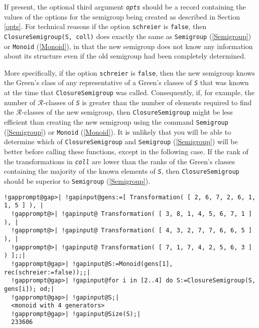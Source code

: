\documentclass[a4paper,11pt]{report}
\begin{document}
{{{ If present, the optional third argument \mbox{\texttt{\mdseries\slshape opts}} should be a record containing the values of the options for the semigroup
being created as described in Section \ref{opts}. For technical reasons if the option \texttt{schreier} is \texttt{false}, then \texttt{ClosureSemigroup(S, coll)} does exactly the same as \texttt{Semigroup} (\ref{Semigroup}) or \texttt{Monoid} (\ref{Monoid}), in that the new semigroup does not know any information about its structure
even if the old semigroup had been completely determined. 

 More specifically, if the option \texttt{schreier} is \texttt{false}, then the new semigroup knows the Green's class of any representative of a
Green's classes of \mbox{\texttt{\mdseries\slshape S}} that was known at the time that \texttt{ClosureSemigroup} was called. Consequently, if, for example, the number of $\mathcal{R}$-classes of \mbox{\texttt{\mdseries\slshape S}} is greater than the number of elements required to find the $\mathcal{R}$-classes of the new semigroup, then \texttt{ClosureSemigroup} might be less efficient than creating the new semigroup using the command \texttt{Semigroup} (\ref{Semigroup}) or \texttt{Monoid} (\ref{Monoid}). It is unlikely that you will be able to determine which of \texttt{ClosureSemigroup} and \texttt{Semigroup} (\ref{Semigroup}) will be better before calling these functions, except in the following case.
If the rank of the transformations in \mbox{\texttt{\mdseries\slshape coll}} are lower than the ranks of the Green's classes containing the majority of the
known elements of \mbox{\texttt{\mdseries\slshape S}}, then \texttt{ClosureSemigroup} should be superior to \texttt{Semigroup} (\ref{Semigroup}). 
\begin{Verbatim}[commandchars=!@|,fontsize=\small,frame=single,label=Example]
  !gapprompt@gap>| !gapinput@gens:=[ Transformation( [ 2, 6, 7, 2, 6, 1, 1, 5 ] ), |
  !gapprompt@>| !gapinput@ Transformation( [ 3, 8, 1, 4, 5, 6, 7, 1 ] ), |
  !gapprompt@>| !gapinput@ Transformation( [ 4, 3, 2, 7, 7, 6, 6, 5 ] ), |
  !gapprompt@>| !gapinput@ Transformation( [ 7, 1, 7, 4, 2, 5, 6, 3 ] ) ];;|
  !gapprompt@gap>| !gapinput@S:=Monoid(gens[1], rec(schreier:=false));;|
  !gapprompt@gap>| !gapinput@for i in [2..4] do S:=ClosureSemigroup(S, gens[i]); od;|
  !gapprompt@gap>| !gapinput@S;|
  <monoid with 4 generators>
  !gapprompt@gap>| !gapinput@Size(S);|
  233606
\end{Verbatim}
 }

 

}}
\end{document}
